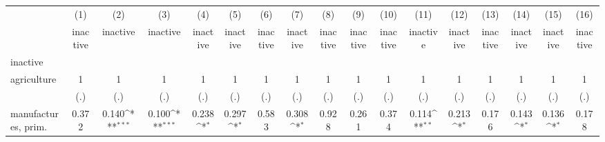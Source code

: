{
\def\sym#1{\ifmmode^{#1}\else\(^{#1}\)\fi}
\begin{tabular}{l*{16}{c}}
\hline\hline
                    &\multicolumn{1}{c}{(1)}&\multicolumn{1}{c}{(2)}&\multicolumn{1}{c}{(3)}&\multicolumn{1}{c}{(4)}&\multicolumn{1}{c}{(5)}&\multicolumn{1}{c}{(6)}&\multicolumn{1}{c}{(7)}&\multicolumn{1}{c}{(8)}&\multicolumn{1}{c}{(9)}&\multicolumn{1}{c}{(10)}&\multicolumn{1}{c}{(11)}&\multicolumn{1}{c}{(12)}&\multicolumn{1}{c}{(13)}&\multicolumn{1}{c}{(14)}&\multicolumn{1}{c}{(15)}&\multicolumn{1}{c}{(16)}\\
                    &\multicolumn{1}{c}{inactive}&\multicolumn{1}{c}{inactive}&\multicolumn{1}{c}{inactive}&\multicolumn{1}{c}{inactive}&\multicolumn{1}{c}{inactive}&\multicolumn{1}{c}{inactive}&\multicolumn{1}{c}{inactive}&\multicolumn{1}{c}{inactive}&\multicolumn{1}{c}{inactive}&\multicolumn{1}{c}{inactive}&\multicolumn{1}{c}{inactive}&\multicolumn{1}{c}{inactive}&\multicolumn{1}{c}{inactive}&\multicolumn{1}{c}{inactive}&\multicolumn{1}{c}{inactive}&\multicolumn{1}{c}{inactive}\\
\hline
inactive            &                     &                     &                     &                     &                     &                     &                     &                     &                     &                     &                     &                     &                     &                     &                     &                     \\
agriculture         &           1         &           1         &           1         &           1         &           1         &           1         &           1         &           1         &           1         &           1         &           1         &           1         &           1         &           1         &           1         &           1         \\
                    &         (.)         &         (.)         &         (.)         &         (.)         &         (.)         &         (.)         &         (.)         &         (.)         &         (.)         &         (.)         &         (.)         &         (.)         &         (.)         &         (.)         &         (.)         &         (.)         \\
[1em]
manufactures, prim. &       0.372         &       0.140\sym{***}&       0.100\sym{***}&       0.238\sym{*}  &       0.297\sym{*}  &       0.583         &       0.308\sym{*}  &       0.928         &       0.261         &       0.374         &       0.114\sym{**} &       0.213\sym{*}  &       0.176         &       0.143\sym{*}  &       0.136\sym{*}  &       0.178         \\

\end{tabular}}
